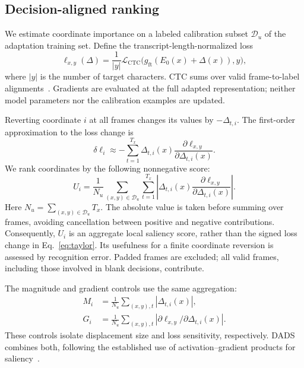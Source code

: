 \documentclass{article}
\newcommand{\ft}{\mathrm{ft}}
\newcommand{\CTC}{\mathrm{CTC}}
\newcommand{\Du}{\mathcal{D}_{u}}
\begin{document}
\subsection{Decision-aligned ranking}
We estimate coordinate importance on a labeled calibration subset $\Du$ of the adaptation training set. Define the transcript-length-normalized loss
\begin{equation}
 \ell_{x,y}(\Delta)=\frac{1}{|y|}
 \mathcal{L}_{\CTC}\bigl(g_{\ft}(E_0(x)+\Delta(x)),y\bigr),
 \label{eq:loss}
\end{equation}
where $|y|$ is the number of target characters. CTC sums over valid frame-to-label alignments~\cite{graves2006ctc}. Gradients are evaluated at the full adapted representation; neither model parameters nor the calibration examples are updated.

Reverting coordinate $i$ at all frames changes its values by $-\Delta_{t,i}$. The first-order approximation to the loss change is
\begin{equation}
 \delta\ell_i\approx-\sum_{t=1}^{T_x}
 \Delta_{t,i}(x)\frac{\partial\ell_{x,y}}{\partial\Delta_{t,i}(x)}.
 \label{eq:taylor}
\end{equation}
We rank coordinates by the following nonnegative score:
\begin{equation}
 U_i=\frac{1}{N_u}\sum_{(x,y)\in\Du}\sum_{t=1}^{T_x}
 \left|\Delta_{t,i}(x)
 \frac{\partial\ell_{x,y}}{\partial\Delta_{t,i}(x)}\right|.
 \label{eq:utility}
\end{equation}
Here $N_u=\sum_{(x,y)\in\Du}T_x$. The absolute value is taken before summing over frames, avoiding cancellation between positive and negative contributions. Consequently, $U_i$ is an aggregate local saliency score, rather than the signed loss change in Eq.~\ref{eq:taylor}. Its usefulness for a finite coordinate reversion is assessed by recognition error. Padded frames are excluded; all valid frames, including those involved in blank decisions, contribute.

The magnitude and gradient controls use the same aggregation:
\begin{align}
 M_i&=\frac{1}{N_u}\sum_{(x,y),t}|\Delta_{t,i}(x)|,\\
 G_i&=\frac{1}{N_u}\sum_{(x,y),t}
 \left|\partial\ell_{x,y}/\partial\Delta_{t,i}(x)\right|.
\end{align}
These controls isolate displacement size and loss sensitivity, respectively. DADS combines both, following the established use of activation--gradient products for saliency~\cite{molchanov2017pruning}.
\end{document}
